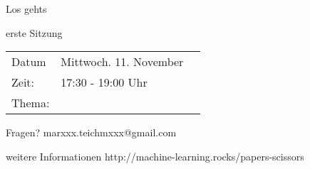 \begin{frame}{Los gehts}

	\begin{block}{erste Sitzung}
        \begin{tabular}{Lll}
          Datum & Mittwoch. 11. November \\
          Zeit: & 17:30 - 19:00 Uhr \\
          Thema: & \\
        \end{tabular}
	\end{block}
	
     \begin{block}{Fragen?}
	  marxxx.teichmxxx@gmail.com
	 \end{block}

    \begin{block}{weitere Informationen}
    http://machine-learning.rocks/papers-scissors
    \end{block}
    

\end{frame}

